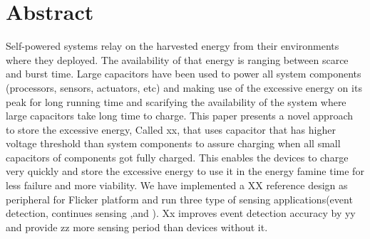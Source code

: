 \section{Abstract}
Self-powered systems relay on the harvested energy from their environments where they deployed. The availability of that energy is ranging between scarce and burst time. Large capacitors have been used to power all system components (processors, sensors, actuators, etc) and making use of the excessive energy on its peak for long running time and scarifying the availability of the system where large capacitors take long time to charge.
This paper presents a novel approach to store the excessive energy, Called xx, that uses capacitor that has higher voltage threshold than system components to assure charging when all small capacitors of components got fully charged.  This enables the devices to charge very quickly and store the excessive energy to use it in the energy famine time for less failure and more viability.  We have implemented a XX reference design as peripheral for Flicker platform and run three type of sensing applications(event detection, continues sensing ,and ). Xx improves event detection accuracy by yy and provide zz more sensing period than devices without it.
